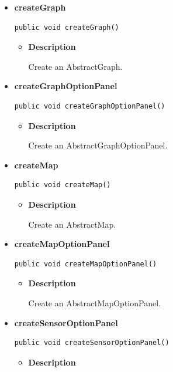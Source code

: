 {{{{{{{{{{{{{{\begin{itemize}
{\begin{itemize}
{Create an AbstractExportOptionPanel.
}
\end{itemize}
}%
\item{ 
\hypertarget{View.AbstractViewFactory.createGraph()}{{\bf  createGraph}\\}
\begin{lstlisting}[frame=none]
public void createGraph()\end{lstlisting} %
\begin{itemize}
\item{
{\bf  Description}

Create an AbstractGraph.
}
\end{itemize}
}%
\item{ 
\hypertarget{View.AbstractViewFactory.createGraphOptionPanel()}{{\bf  createGraphOptionPanel}\\}
\begin{lstlisting}[frame=none]
public void createGraphOptionPanel()\end{lstlisting} %
\begin{itemize}
\item{
{\bf  Description}

Create an AbstractGraphOptionPanel.
}
\end{itemize}
}%
\item{ 
\hypertarget{View.AbstractViewFactory.createMap()}{{\bf  createMap}\\}
\begin{lstlisting}[frame=none]
public void createMap()\end{lstlisting} %
\begin{itemize}
\item{
{\bf  Description}

Create an AbstractMap.
}
\end{itemize}
}%
\item{ 
\hypertarget{View.AbstractViewFactory.createMapOptionPanel()}{{\bf  createMapOptionPanel}\\}
\begin{lstlisting}[frame=none]
public void createMapOptionPanel()\end{lstlisting} %
\begin{itemize}
\item{
{\bf  Description}

Create an AbstractMapOptionPanel.
}
\end{itemize}
}%
\item{ 
\hypertarget{View.AbstractViewFactory.createSensorOptionPanel()}{{\bf  createSensorOptionPanel}\\}
\begin{lstlisting}[frame=none]
public void createSensorOptionPanel()\end{lstlisting} %
\begin{itemize}
\item{
{\bf  Description}

}
\end{itemize}}
\end{itemize}}}}}}}}}}}}}}}
